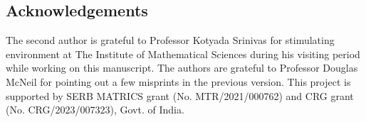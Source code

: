 \documentclass[12pt, 14paper,reqno]{amsart}
\theoremstyle{plain}
\theoremstyle{proof}
\numberwithin{equation}{section}
\begin{document}
\subsection*{Acknowledgements}
The second author is grateful to Professor Kotyada Srinivas for stimulating environment at The Institute of Mathematical Sciences during his visiting period while working on this manuscript. The authors are grateful to Professor Douglas McNeil for pointing out a few misprints in the previous version. This project is supported by SERB MATRICS grant (No. MTR/2021/000762) and  CRG grant (No. CRG/2023/007323),  Govt. of India. 
\end{document}

